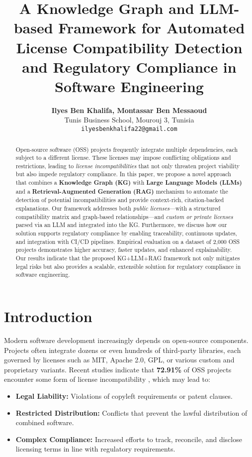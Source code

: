 \documentclass[9pt,twocolumn]{article}
\begin{document}
\title{\textbf{A Knowledge Graph and LLM-based Framework for Automated License Compatibility Detection and Regulatory Compliance in Software Engineering}}
\author{\textbf{Ilyes Ben Khalifa, Montassar Ben Messaoud}\\
Tunis Business School, Mourouj 3, Tunisia\\
\texttt{ilyesbenkhalifa22@gmail.com}}
\date{}
\maketitle

\begin{abstract}
Open-source software (OSS) projects frequently integrate multiple dependencies, each subject to a different license. These licenses may impose conflicting obligations and restrictions, leading to \emph{license incompatibilities} that not only threaten project viability but also impede regulatory compliance. In this paper, we propose a novel approach that combines a \textbf{Knowledge Graph (KG)} with \textbf{Large Language Models (LLMs)} and a \textbf{Retrieval-Augmented Generation (RAG)} mechanism to automate the detection of potential incompatibilities and provide context-rich, citation-backed explanations. Our framework addresses both \emph{public licenses}—with a structured compatibility matrix and graph-based relationships—and \emph{custom or private licenses} parsed via an LLM and integrated into the KG. Furthermore, we discuss how our solution supports regulatory compliance by enabling traceability, continuous updates, and integration with CI/CD pipelines. Empirical evaluation on a dataset of 2,000 OSS projects demonstrates higher accuracy, faster updates, and enhanced explainability. Our results indicate that the proposed KG+LLM+RAG framework not only mitigates legal risks but also provides a scalable, extensible solution for regulatory compliance in software engineering.
\end{abstract}

\section{Introduction}
\label{sec:intro}
Modern software development increasingly depends on open-source components. Projects often integrate dozens or even hundreds of third-party libraries, each governed by licenses such as MIT, Apache 2.0, GPL, or various custom and proprietary variants. Recent studies indicate that \textbf{72.91\%} of OSS projects encounter some form of license incompatibility \cite{vendome2017license}, which may lead to:
\begin{itemize}
    \item \textbf{Legal Liability:} Violations of copyleft requirements or patent clauses.
    \item \textbf{Restricted Distribution:} Conflicts that prevent the lawful distribution of combined software.
    \item \textbf{Complex Compliance:} Increased efforts to track, reconcile, and disclose licensing terms in line with regulatory requirements.
\end{itemize}
\end{document}

